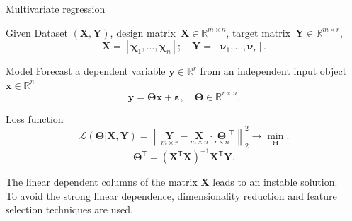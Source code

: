 \documentclass[9pt]{beamer}
\newcommand{\bx}{\mathbf{x}}
\newcommand{\by}{\mathbf{y}}
\newcommand{\bY}{\mathbf{Y}}
\newcommand{\bX}{\mathbf{X}}
\newcommand{\bbR}{\mathbb{R}}
\newcommand{\bchi}{\boldsymbol{\chi}}
\newcommand{\bnu}{\boldsymbol{\nu}}
\newcommand{\bTheta}{\boldsymbol{\Theta}}
\newcommand{\T}{\mathsf{T}}
\begin{document}
\begin{frame}{Multivariate regression}
	\begin{block}{Given}
	Dataset $\left( \bX, \bY \right)$, design matrix~$\bX \in \bbR^{m \times n}$, target matrix~$\bY \in \bbR^{m \times r}$,
	\[
	\bX = [\bchi_1, \dots, \bchi_n]; \quad \bY =  [\bnu_1, \dots, \bnu_r].
	\]
	\vspace{-0.7cm}
	\end{block}

\begin{block}{Model}
	Forecast a dependent variable $\by \in \bbR^r$ from an independent input object $\bx \in \bbR^n$
	\[
	\by = \bTheta \bx+ \boldsymbol{\varepsilon}, \quad \bTheta \in \bbR^{r \times n}.
	\]
	\vspace{-0.7cm}
\end{block}
	\begin{block}{Loss function}
	\[
	\mathcal{L}(\bTheta | \bX, \bY) = {\left\| \underset{m \times r}{\mathbf{Y}}  - \underset{m \times n}{\bX} \cdot \underset{r \times n}{\bTheta}^{\T} \right\| }_2^2 \rightarrow\min_{\bTheta}.
	\label{eq:error_function}
	\]
	\[
	\bTheta^{\T} = (\bX^{\T} \bX)^{-1} \bX^{\T} \bY.
	\]
	\end{block}
	The linear dependent columns of the matrix $\bX$ leads to an instable solution. \\
	To avoid the strong linear dependence, dimensionality reduction and feature selection techniques are used.
\end{frame}
\end{document}
